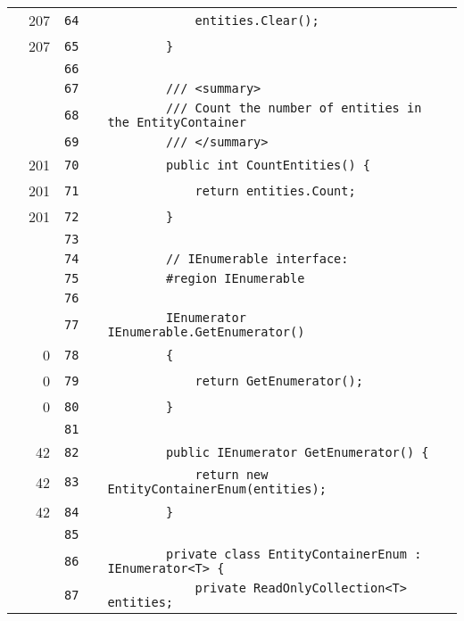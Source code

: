 \documentclass[a4paper,landscape,10pt]{article}
\begin{document}
\begin{longtable}[l]{lrrll}
\cellcolor{green} & 207 & \verb~64~ & & \verb~            entities.Clear();~\\
\cellcolor{green} & 207 & \verb~65~ & & \verb~        }~\\
\cellcolor{gray} &  & \verb~66~ & & \verb~~\\
\cellcolor{gray} &  & \verb~67~ & & \verb~        /// <summary>~\\
\cellcolor{gray} &  & \verb~68~ & & \verb~        /// Count the number of entities in the EntityContainer~\\
\cellcolor{gray} &  & \verb~69~ & & \verb~        /// </summary>~\\
\cellcolor{green} & 201 & \verb~70~ & & \verb~        public int CountEntities() {~\\
\cellcolor{green} & 201 & \verb~71~ & & \verb~            return entities.Count;~\\
\cellcolor{green} & 201 & \verb~72~ & & \verb~        }~\\
\cellcolor{gray} &  & \verb~73~ & & \verb~~\\
\cellcolor{gray} &  & \verb~74~ & & \verb~        // IEnumerable interface:~\\
\cellcolor{gray} &  & \verb~75~ & & \verb~        #region IEnumerable~\\
\cellcolor{gray} &  & \verb~76~ & & \verb~~\\
\cellcolor{gray} &  & \verb~77~ & & \verb~        IEnumerator IEnumerable.GetEnumerator()~\\
\cellcolor{red} & 0 & \verb~78~ & & \verb~        {~\\
\cellcolor{red} & 0 & \verb~79~ & & \verb~            return GetEnumerator();~\\
\cellcolor{red} & 0 & \verb~80~ & & \verb~        }~\\
\cellcolor{gray} &  & \verb~81~ & & \verb~~\\
\cellcolor{green} & 42 & \verb~82~ & & \verb~        public IEnumerator GetEnumerator() {~\\
\cellcolor{green} & 42 & \verb~83~ & & \verb~            return new EntityContainerEnum(entities);~\\
\cellcolor{green} & 42 & \verb~84~ & & \verb~        }~\\
\cellcolor{gray} &  & \verb~85~ & & \verb~~\\
\cellcolor{gray} &  & \verb~86~ & & \verb~        private class EntityContainerEnum : IEnumerator<T> {~\\
\cellcolor{gray} &  & \verb~87~ & & \verb~            private ReadOnlyCollection<T> entities;~\\

\end{longtable}
\end{document}
